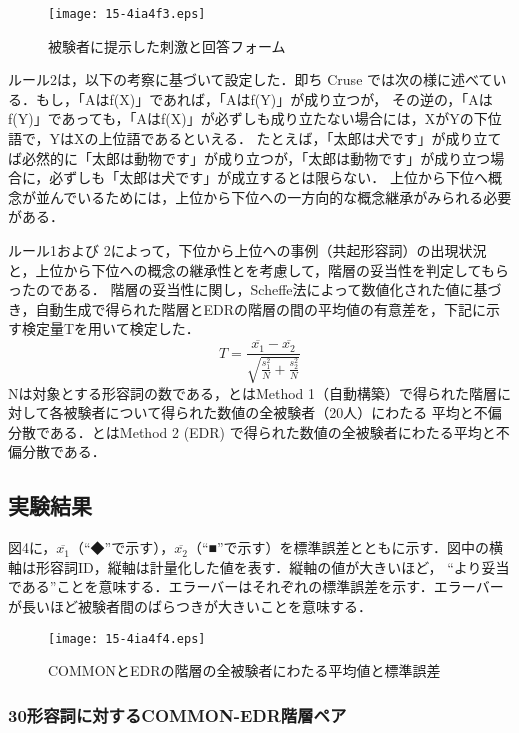 \documentclass[japanese]{jnlp_1.4}
\begin{document}
\begin{figure}[t]
\begin{center}
\texttt{[image: 15-4ia4f3.eps]}
\end{center}
\caption{被験者に提示した刺激と回答フォーム}
\end{figure}

ルール2は，以下の考察に基づいて設定した．即ち Cruse では次の様に述べている\cite{book_06}．もし，「Aはf(X)」であれば，「Aはf(Y)」が成り立つが，
その逆の，「Aはf(Y)」であっても，「Aはf(X)」が必ずしも成り立たない場合には，XがYの下位語で，YはXの上位語であるといえる．
たとえば，「太郎は犬です」が成り立てば必然的に「太郎は動物です」が成り立つが，「太郎は動物です」が成り立つ場合に，必ずしも「太郎は犬です」が成立するとは限らない．
上位から下位へ概念が並んでいるためには，上位から下位への一方向的な概念継承がみられる必要がある．

ルール1および 2によって，下位から上位への事例（共起形容詞）の出現状況と，上位から下位への概念の継承性とを考慮して，階層の妥当性を判定してもらったのである．
階層の妥当性に関し，Scheffe法によって数値化された値に基づき，自動生成で得られた階層とEDRの階層の間の平均値の有意差を，下記に示す検定量Tを用いて検定した．
\begin{equation}
T = \frac{\overline{x_1} - \overline{x_2}} {\sqrt{\frac{s_1^2}{N} + \frac{s_2^2}{N}}} 
\end{equation}
Nは対象とする形容詞の数である，とはMethod 1（自動構築）で得られた階層に対して各被験者について得られた数値の全被験者（20人）にわたる
平均と不偏分散である．とはMethod 2 (EDR) で得られた数値の全被験者にわたる平均と不偏分散である．


\subsection{実験結果}

図4に，$\overline{x_{1}}$（“◆”で示す），$\overline{x_{2}}$（“■”で示す）を標準誤差とともに示す．図中の横軸は形容詞ID，縦軸は計量化した値を表す．縦軸の値が大きいほど，
“より妥当である”ことを意味する．エラーバーはそれぞれの標準誤差を示す．エラーバーが長いほど被験者間のばらつきが大きいことを意味する．


\begin{figure}[b]
\begin{center}
\texttt{[image: 15-4ia4f4.eps]}
\end{center}
\caption{COMMONとEDRの階層の全被験者にわたる平均値と標準誤差}
\end{figure}

\subsubsection{30形容詞に対するCOMMON-EDR階層ペア}
\end{document}
